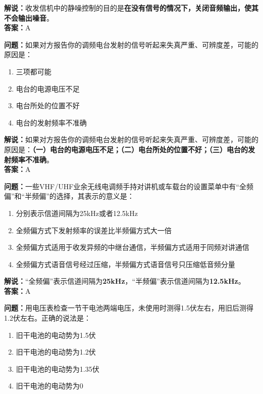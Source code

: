 \textbf{解说：}收发信机中的静噪控制的目的是\textbf{在没有信号的情况下，关闭音频输出，使其不会输出噪音}。\\\textbf{答案：}A%

\textbf{问题：}如果对方报告你的调频电台发射的信号听起来失真严重、可辨度差，可能的原因是：

\begin{enumerate}[label=\Alph*), leftmargin=1.5cm]
	\item 三项都可能
	\item 电台的电源电压不足
	\item 电台所处的位置不好
	\item 电台的发射频率不准确
\end{enumerate}

\textbf{解说：}如果对方报告你的调频电台发射的信号听起来失真严重、可辨度差，可能的原因是：\textbf{（一）电台的电源电压不足；（二）电台所处的位置不好；（三）电台的发射频率不准确}。\\\textbf{答案：}A%


\textbf{问题：}一些VHF/UHF业余无线电调频手持对讲机或车载台的设置菜单中有“全频偏”和“半频偏”的选择，其表示的意义是：

\begin{enumerate}[label=\Alph*), leftmargin=1.5cm]
	\item 分别表示信道间隔为25kHz或者12.5kHz
	\item 全频偏方式下发射频率的误差比半频偏方式大一倍
	\item 全频偏方式适用于收发异频的中继台通信，半频偏方式适用于同频对讲通信
	\item 全频偏方式语音信号经过压缩，半频偏方式语音信号只压缩低音频分量
\end{enumerate}

\textbf{解说：}“全频偏”表示信道间隔为\textbf{25kHz}，“半频偏”表示信道间隔为\textbf{12.5kHz}。\\\textbf{答案：}A%


\textbf{问题：}用电压表检查一节干电池两端电压，未使用时测得1.5伏左右，用旧后测得1.2伏左右。正确的说法是：

\begin{enumerate}[label=\Alph*), leftmargin=1.5cm]
	\item 旧干电池的电动势为1.5伏
	\item 旧干电池的电动势为1.2伏
	\item 旧干电池的电动势为1.35伏
	\item 旧干电池的电动势为0
\end{enumerate}

